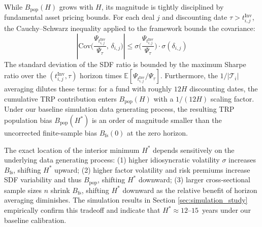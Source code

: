 \begin{remark}
	While $B_{\text{pop}}(H)$ grows with $H$, its magnitude is tightly disciplined by fundamental asset pricing bounds. For each deal $j$ and discounting date $\tau > t_{i,j}^{\mathrm{Inv}}$, the Cauchy--Schwarz inequality applied to the \cite{HJ91} framework bounds the covariance:
	\begin{equation*}
		\left| \mathrm{Cov}\Big(\frac{\Psi_{t_{i,j}^{\mathrm{Inv}}}}{\Psi_\tau},\, \delta_{i,j}\Big) \right| 
		\leq 
		\sigma\Big(\frac{\Psi_{t_{i,j}^{\mathrm{Inv}}}}{\Psi_\tau}\Big) \cdot \sigma(\delta_{i,j})
	\end{equation*}
	The standard deviation of the SDF ratio is bounded by the maximum Sharpe ratio over the $(t_{i,j}^{\mathrm{Inv}}, \tau)$ horizon times $\mathbb{E}[\Psi_{t_{i,j}^{\mathrm{Inv}}}/\Psi_\tau]$. 
	Furthermore, the $1/|\mathcal{T}_i|$ averaging dilutes these terms: for a fund with roughly $12H$ discounting dates, the cumulative TRP contribution enters $B_{\text{pop}}(H)$ with a $1/(12H)$ scaling factor.
	Under our baseline simulation data generating process, the resulting TRP population bias $B_{\text{pop}}(H^*)$ is an order of magnitude smaller than the uncorrected finite-sample bias $B_{\text{fs}}(0)$ at the zero horizon.
\end{remark}

\begin{remark}
	The exact location of the interior minimum $H^*$ depends sensitively on the underlying data generating process:
	(1) higher idiosyncratic volatility $\sigma$ increases $B_{\text{fs}}$, shifting $H^*$ upward; 
	(2) higher factor volatility and risk premiums increase SDF variability and thus $B_{\text{pop}}$, shifting $H^*$ downward; 
	(3) larger cross-sectional sample sizes $n$ shrink $B_{\text{fs}}$, shifting $H^*$ downward as the relative benefit of horizon averaging diminishes.
	The simulation results in Section \ref{sec:simulation_study} empirically confirm this tradeoff and indicate that $H^* \approx 12$--$15$~years under our baseline calibration.
\end{remark}

